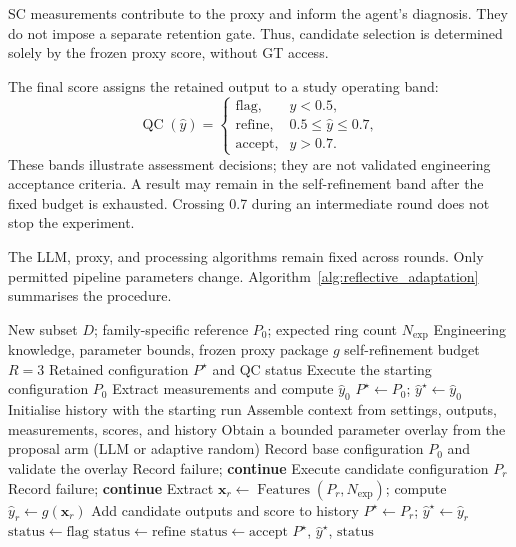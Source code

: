 \documentclass[a4paper,fleqn]{cas-dc}
\begin{document}
{SC measurements contribute to the proxy and inform the agent's diagnosis. They do not impose a separate retention gate. Thus, candidate selection is determined solely by the frozen proxy score, without GT access.

The final score assigns the retained output to a study operating band:
\begin{equation}
\operatorname{QC}(\hat{y})=
\begin{cases}
\text{flag}, & \hat{y}<0.5,\\
\text{refine}, & 0.5\leq\hat{y}\leq0.7,\\
\text{accept}, & \hat{y}>0.7.
\end{cases}
\label{eq:qc-bands}
\end{equation}
These bands illustrate assessment decisions; they are not validated engineering acceptance criteria. A result may remain in the self-refinement band after the fixed budget is exhausted. Crossing 0.7 during an intermediate round does not stop the experiment.

The LLM, proxy, and processing algorithms remain fixed across rounds. Only permitted pipeline parameters change. Algorithm~\ref{alg:reflective_adaptation} summarises the procedure.

\begin{algorithm}[ht]
\caption{Proxy-guided parameter self-refinement}
\label{alg:reflective_adaptation}
\begin{algorithmic}[1]
\Require New subset $D$; family-specific reference $P_0$; expected ring count $N_{\mathrm{exp}}$
\Require Engineering knowledge, parameter bounds, frozen proxy package $g$
\Require self-refinement budget $R=3$
\Ensure Retained configuration $P^\star$ and QC status
\State Execute the starting configuration $P_0$
\State Extract measurements and compute $\hat{y}_0$
\State $P^\star\gets P_0$; $\hat{y}^\star\gets\hat{y}_0$
\State Initialise history with the starting run
    \State Assemble context from settings, outputs, measurements, scores, and history
    \State Obtain a bounded parameter overlay from the proposal arm (LLM or adaptive random)
    \State Record base configuration $P_0$ and validate the overlay
        \State Record failure; \textbf{continue}
    \EndIf
    \State Execute candidate configuration $P_r$
        \State Record failure; \textbf{continue}
    \EndIf
    \State Extract $\mathbf{x}_r\gets\operatorname{Features}(P_r,N_{\mathrm{exp}})$; compute $\hat{y}_r\gets g(\mathbf{x}_r)$
    \State Add candidate outputs and score to history
        \State $P^\star\gets P_r$; $\hat{y}^\star\gets\hat{y}_r$
    \EndIf
\EndFor
{}
    \State $\mathrm{status}\gets\mathrm{flag}$
    \State $\mathrm{status}\gets\mathrm{refine}$
\Else
    \State $\mathrm{status}\gets\mathrm{accept}$
\EndIf
\State \Return $P^\star$, $\hat{y}^\star$, $\mathrm{status}$
\end{algorithmic}
\end{algorithm}


}
\end{document}
